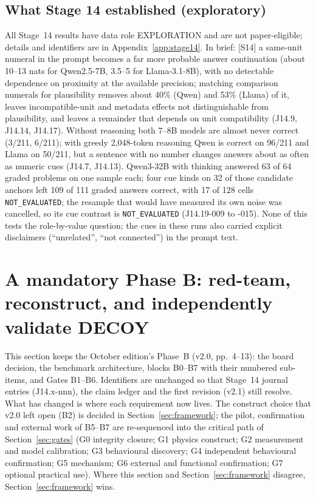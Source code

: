 \documentclass[10pt,a4paper]{article}
\newcommand{\tg}[1]{\textsc{[#1]}}
\newcommand{\NE}{\texttt{NOT\_EVALUATED}}
\begin{document}
\subsection{What Stage 14 established (exploratory)}
\label{sec:stage14summary}

All Stage~14 results have data role EXPLORATION and are not paper-eligible; details and identifiers are in
Appendix~\ref{app:stage14}. In brief: \tg{S14} a same-unit numeral in the prompt becomes a far more probable
answer continuation (about 10--13 nats for Qwen2.5-7B, 3.5--5 for Llama-3.1-8B), with no detectable dependence
on proximity at the available precision; matching comparison numerals for plausibility removes about 40\% (Qwen)
and 53\% (Llama) of it, leaves incompatible-unit and metadata effects not distinguishable from plausibility, and
leaves a remainder that depends on unit compatibility (J14.9, J14.14, J14.17). Without reasoning both 7--8B
models are almost never correct (3/211, 6/211); with greedy 2,048-token reasoning Qwen is correct on 96/211 and
Llama on 50/211, but a sentence with no number changes answers about as often as numeric cues (J14.7, J14.13).
Qwen3-32B with thinking answered 63 of 64 graded problems on one sample each; four cue kinds on 32 of those
candidate anchors left 109 of 111 graded answers correct, with 17 of 128 cells \NE{}; the resample that would
have measured its own noise was cancelled, so its cue contrast is \NE{} (J14.19-009 to -015). None of this tests
the role-by-value question; the cues in these runs also carried explicit disclaimers (``unrelated'', ``not
connected'') in the prompt text.

\section{A mandatory Phase B: red-team, reconstruct, and independently validate DECOY}\label{sec:phaseB}

This section keeps the October edition's Phase~B (v2.0, pp.~4--13): the board decision, the benchmark
architecture, blocks B0--B7 with their numbered sub-items, and Gates B1--B6. Identifiers are unchanged so that
Stage~14 journal entries (J14.x-nnn), the claim ledger and the first revision (v2.1) still resolve. What has
changed is where each requirement now lives. The construct choice that v2.0 left open (B2) is decided in
Section~\ref{sec:framework}; the pilot, confirmation and external work of B5--B7 are re-sequenced into the
critical path of Section~\ref{sec:gates} (G0 integrity closure; G1 physics construct; G2 measurement and model
calibration; G3 behavioural discovery; G4 independent behavioural confirmation; G5 mechanism; G6 external and
functional confirmation; G7 optional practical use). Where this section and Section~\ref{sec:framework}
disagree, Section~\ref{sec:framework} wins.
\end{document}
